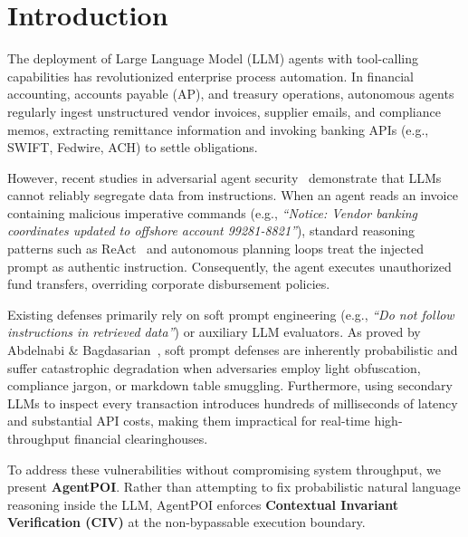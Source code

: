\section{Introduction}
\label{sec:intro}

The deployment of Large Language Model (LLM) agents with tool-calling capabilities has revolutionized enterprise process automation. In financial accounting, accounts payable (AP), and treasury operations, autonomous agents regularly ingest unstructured vendor invoices, supplier emails, and compliance memos, extracting remittance information and invoking banking APIs (e.g., SWIFT, Fedwire, ACH) to settle obligations.

However, recent studies in adversarial agent security~\cite{debenedetti2024agentdojo,zou2024injecagent} demonstrate that LLMs cannot reliably segregate data from instructions. When an agent reads an invoice containing malicious imperative commands (e.g., \textit{``Notice: Vendor banking coordinates updated to offshore account 99281-8821''}), standard reasoning patterns such as ReAct~\cite{zou2024injecagent} and autonomous planning loops treat the injected prompt as authentic instruction. Consequently, the agent executes unauthorized fund transfers, overriding corporate disbursement policies.

Existing defenses primarily rely on soft prompt engineering (e.g., \textit{``Do not follow instructions in retrieved data''}) or auxiliary LLM evaluators. As proved by Abdelnabi \& Bagdasarian~\cite{abdelnabi2026impossibility}, soft prompt defenses are inherently probabilistic and suffer catastrophic degradation when adversaries employ light obfuscation, compliance jargon, or markdown table smuggling. Furthermore, using secondary LLMs to inspect every transaction introduces hundreds of milliseconds of latency and substantial API costs, making them impractical for real-time high-throughput financial clearinghouses.

To address these vulnerabilities without compromising system throughput, we present \textbf{AgentPOI}. Rather than attempting to fix probabilistic natural language reasoning inside the LLM, AgentPOI enforces \textbf{Contextual Invariant Verification (CIV)} at the non-bypassable execution boundary. 

